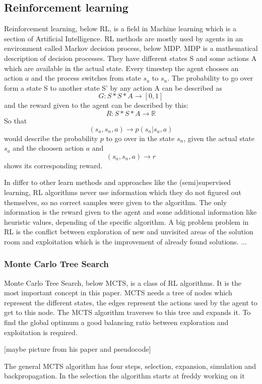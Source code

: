 \subsection{Reinforcement learning} 
 
Reinforcement learning, below RL, is a field in Machine learning which is a section of Artificial Intelligence. RL methods are mostly used by agents in an environment called Markov decision process, below MDP. MDP is a mathematical description of decision processes. They have different states S and some actions A which are available in the actual state. Every timestep the agent chooses an action $a$ and the process switches from state $s_a$ to $s_n$. The probability to go over form a state S to another state S' by any action A can be described as
\[
	G: S*S*A \rightarrow [0,1] 
\] 
and the reward given to the agent can be described by this:
\[
	R: S*S*A \rightarrow \mathbb{R}
\]
So that
\[
	(s_a, s_n, a) \rightarrow p(s_n|s_a, a)
\]
would describe the probability $p$ to go over in the state $s_n$, given the actual state $s_a$ and the choosen action $a$ and 
\[
	(s_a, s_n, a) \rightarrow r
\]
shows its corresponding reward.  


In differ to other learn methods and approaches like the (semi)supervised learning, RL algorithms never use information which they do not figured out themselves, so no correct samples were given to the algorithm. The only information is the reward given to the agent and some additional information like heuristic values, depending of the specific algorithm. 
A big problem problem in RL is the conflict between exploration of new and unvisited areas of the solution room and exploitation which is the improvement of already found solutions.
...
\subsubsection{Monte Carlo Tree Search} 

Monte Carlo Tree Search, below MCTS, is a class of RL algorithms. It is the most important concept in this paper. MCTS needs a tree of nodes which represent the different states, the edges represent the actions used by the agent to get to this node. The MCTS algorithm traverses to this tree and expands it. To find the global optimum a good balancing ratio between exploration and exploitation is required. 

[maybe picture from his paper and pseudocode]

The general MCTS algorithm has four steps, selection, expansion, simulation and backpropagation. In the selection the algorithm starts at  
freddy working on it 


